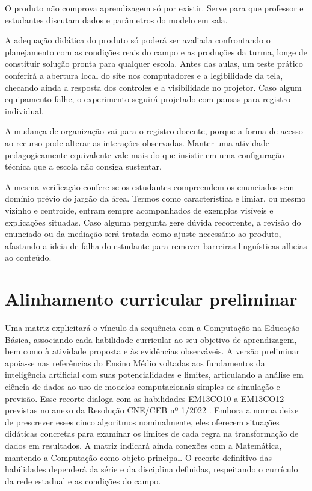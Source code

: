 O produto não comprova aprendizagem só por existir. Serve para que professor e estudantes discutam dados e parâmetros do modelo em sala.

A adequação didática do produto só poderá ser avaliada confrontando o planejamento com as condições reais do campo e as produções da turma, longe de constituir solução pronta para qualquer escola. Antes das aulas, um teste prático conferirá a abertura local do site nos computadores e a legibilidade da tela, checando ainda a resposta dos controles e a visibilidade no projetor. Caso algum equipamento falhe, o experimento seguirá projetado com pausas para registro individual.

A mudança de organização vai para o registro docente, porque a forma de acesso ao recurso pode alterar as interações observadas. Manter uma atividade pedagogicamente equivalente vale mais do que insistir em uma configuração técnica que a escola não consiga sustentar.

A mesma verificação confere se os estudantes compreendem os enunciados sem domínio prévio do jargão da área. Termos como característica e limiar, ou mesmo vizinho e centroide, entram sempre acompanhados de exemplos visíveis e explicações situadas. Caso alguma pergunta gere dúvida recorrente, a revisão do enunciado ou da mediação será tratada como ajuste necessário ao produto, afastando a ideia de falha do estudante para remover barreiras linguísticas alheias ao conteúdo.

\section{Alinhamento curricular preliminar}

Uma matriz explicitará o vínculo da sequência com a Computação na Educação Básica, associando cada habilidade curricular ao seu objetivo de aprendizagem, bem como à atividade proposta e às evidências observáveis. A versão preliminar apoia-se nas referências do Ensino Médio voltadas aos fundamentos da inteligência artificial com suas potencialidades e limites, articulando a análise em ciência de dados ao uso de modelos computacionais simples de simulação e previsão. Esse recorte dialoga com as habilidades EM13CO10 a EM13CO12 previstas no anexo da Resolução CNE/CEB nº 1/2022 \cite{brasil2022computacao}. Embora a norma deixe de prescrever esses cinco algoritmos nominalmente, eles oferecem situações didáticas concretas para examinar os limites de cada regra na transformação de dados em resultados. A matriz indicará ainda conexões com a Matemática, mantendo a Computação como objeto principal. O recorte definitivo das habilidades dependerá da série e da disciplina definidas, respeitando o currículo da rede estadual e as condições do campo.

